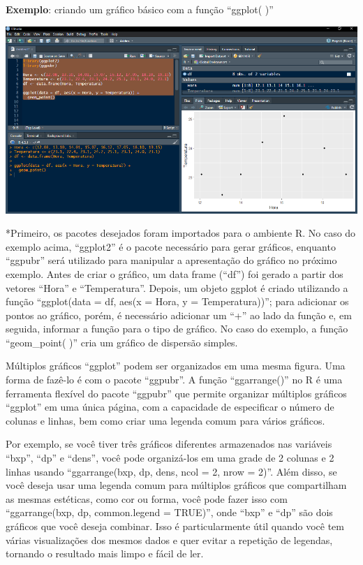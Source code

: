 \documentclass[
]{book}
\begin{document}
\textbf{Exemplo}: criando um gráfico básico com a função ``ggplot( )''

\includegraphics{images/clipboard-1758074744.png}

*Primeiro, os pacotes desejados foram importados para o ambiente R. No caso do exemplo acima, ``ggplot2'' é o pacote necessário para gerar gráficos, enquanto ``ggpubr'' será utilizado para manipular a apresentação do gráfico no próximo exemplo. Antes de criar o gráfico, um data frame (``df'') foi gerado a partir dos vetores ``Hora'' e ``Temperatura''. Depois, um objeto ggplot é criado utilizando a função ``ggplot(data = df, aes(x = Hora, y = Temperatura))''; para adicionar os pontos ao gráfico, porém, é necessário adicionar um ``+'' ao lado da função e, em seguida, informar a função para o tipo de gráfico. No caso do exemplo, a função ``geom\_point( )'' cria um gráfico de dispersão simples.

Múltiplos gráficos ``ggplot'' podem ser organizados em uma mesma figura. Uma forma de fazê-lo é com o pacote ``ggpubr''. A função ``ggarrange()'' no R é uma ferramenta flexível do pacote ``ggpubr'' que permite organizar múltiplos gráficos ``ggplot'' em uma única página, com a capacidade de especificar o número de colunas e linhas, bem como criar uma legenda comum para vários gráficos.

Por exemplo, se você tiver três gráficos diferentes armazenados nas variáveis ``bxp'', ``dp'' e ``dens'', você pode organizá-los em uma grade de 2 colunas e 2 linhas usando ``ggarrange(bxp, dp, dens, ncol = 2, nrow = 2)''. Além disso, se você deseja usar uma legenda comum para múltiplos gráficos que compartilham as mesmas estéticas, como cor ou forma, você pode fazer isso com ``ggarrange(bxp, dp, common.legend = TRUE)'', onde ``bxp'' e ``dp'' são dois gráficos que você deseja combinar. Isso é particularmente útil quando você tem várias visualizações dos mesmos dados e quer evitar a repetição de legendas, tornando o resultado mais limpo e fácil de ler.
\end{document}

